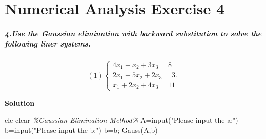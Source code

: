 \documentclass[
]{article}
\author{}
\date{}
\newenvironment{Shaded}{}{}
\newcommand{\CommentTok}[1]{\textcolor[rgb]{0.38,0.63,0.69}{\textit{#1}}}
\newcommand{\NormalTok}[1]{#1}
\newcommand{\OperatorTok}[1]{\textcolor[rgb]{0.40,0.40,0.40}{#1}}
\newcommand{\StringTok}[1]{\textcolor[rgb]{0.25,0.44,0.63}{#1}}
\newcommand{\VariableTok}[1]{\textcolor[rgb]{0.10,0.09,0.49}{#1}}
\begin{document}
\hypertarget{numerical-analysis-exercise-4}{%
\section{Numerical Analysis Exercise
4}\label{numerical-analysis-exercise-4}}

\hypertarget{4use-the-gaussian-elimination-with-backward-substitution-to-solve-the-following-liner-systems}{%
\subparagraph{4.Use the Gaussian elimination with backward substitution
to solve the following liner
systems.}\label{4use-the-gaussian-elimination-with-backward-substitution-to-solve-the-following-liner-systems}}

\[(1)\left\{\begin{matrix} 
  4x_{1}-x_{2}+3x_{3}=8 \\  
  2x_{1}+5x_{2}+2x_{3}=3.\\
  x_{1}+2x_{2}+4x_{3}=11
\end{matrix}\right.\]

\textbf{Solution}

\begin{Shaded}
\begin{Highlighting}[]
\VariableTok{clc}
\VariableTok{clear}
\CommentTok{\%Gaussian Elimination Method\%}
\VariableTok{A}\OperatorTok{=}\VariableTok{input}\NormalTok{(}\StringTok{"Please input the a:"}\NormalTok{)}
\VariableTok{b}\OperatorTok{=}\VariableTok{input}\NormalTok{(}\StringTok{"Please input the b:"}\NormalTok{)}
\VariableTok{b}\OperatorTok{=}\VariableTok{b}\OperatorTok{\textquotesingle{};}
\VariableTok{Gauss}\NormalTok{(}\VariableTok{A}\OperatorTok{,}\VariableTok{b}\NormalTok{)}
\end{Highlighting}
\end{Shaded}
\end{document}
